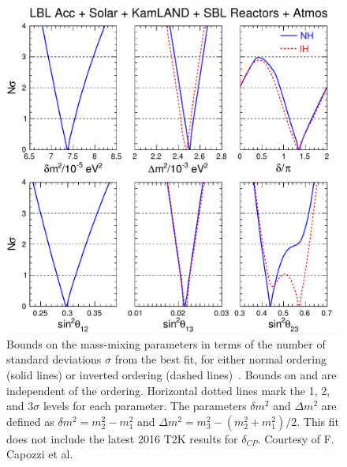 \begin{figure}[htbp]
\begin{center}
   	      \includegraphics[width=0.8\linewidth]{figures/Fig_01_lisi.pdf}
    \caption{Bounds on the mass-mixing parameters in terms of
the number of standard deviations $\sigma$ from the best fit, for either normal ordering (solid lines) or inverted ordering (dashed lines)~\cite{Capozzi:2016rtj}. Bounds on \dmsqso and \thsol are
independent of the ordering. Horizontal dotted lines mark the 1, 2, and 3$\sigma$ levels for each parameter. The parameters $\delta m^2$ and $\Delta m^2$ are defined as 
$\delta m^2 = m^2_2 - m^2_1$ and $\Delta m^2 = m^2_3 - (m^2_2 + m^2_1)/2$.
This fit does not include the latest 2016 T2K results for $\delta_{CP}$.
Courtesy of F. Capozzi et al.}
 \label{fig:globalfit}
 \end{center}
\end{figure}


